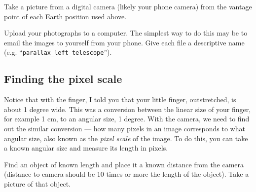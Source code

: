 \begin{steps}
	\item Take a picture from a digital camera (likely your phone camera) from the vantage point of each Earth position used above.
	
	


	\item Upload your photographs to a computer. The simplest way to do this may be to email the images to yourself from your phone. Give each file a descriptive name (e.g. ``\texttt{parallax\_left\_telescope}'').
\end{steps}

\subsection{Finding the pixel scale}

Notice that with the finger, I told you that your little finger, outstretched, is about 1 degree wide. This was a conversion between the linear size of your finger, for example 1 cm, to an angular size, 1 degree. With the camera, we need to find out the similar conversion --- how many pixels in an image corresponds to what angular size, also known as the \textit{pixel scale} of the image. To do this, you can take a known angular size and measure its length in pixels.
\begin{steps}
	\item Find an object of known length and place it a known distance from the camera (distance to camera should be 10 times or more the length of the object). Take a picture of that object.
\end{steps}

